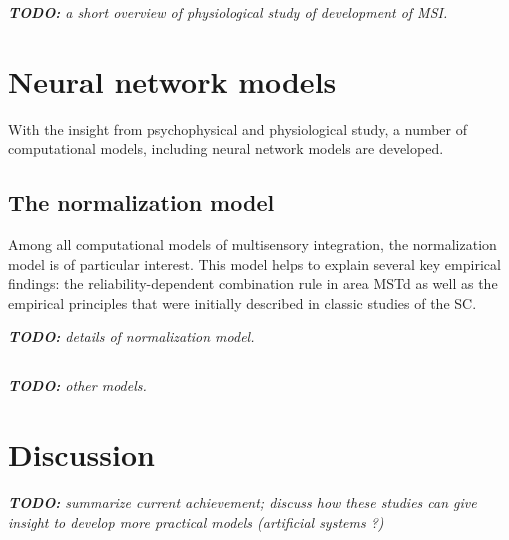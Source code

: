 \documentclass[12pt,twoside]{article}
\theoremstyle{plain}
\theoremstyle{definition}
\theoremstyle{remark}
\newcommand{\TODO}[1]{\emph{\small{{\bf TODO: } #1}}}
\begin{document}
\TODO{a short overview of physiological study of development of MSI.}

\section{Neural network models}
With the insight from psychophysical and physiological study, a number of computational models, including neural network models are developed. 

\subsection{The normalization model}
Among all computational models of multisensory integration, the normalization model\cite{ohshiro_normalization_2011} is of particular interest. This model helps to explain several key empirical findings: the reliability-dependent combination rule in area MSTd as well as
the empirical principles that were initially described in classic studies of the SC.

\TODO{details of normalization model.}

\subsection{}
\TODO{other models.}

\section{Discussion}
\TODO{summarize current achievement; discuss how these studies can give insight to develop more practical models (artificial systems ?)}



\end{document}
